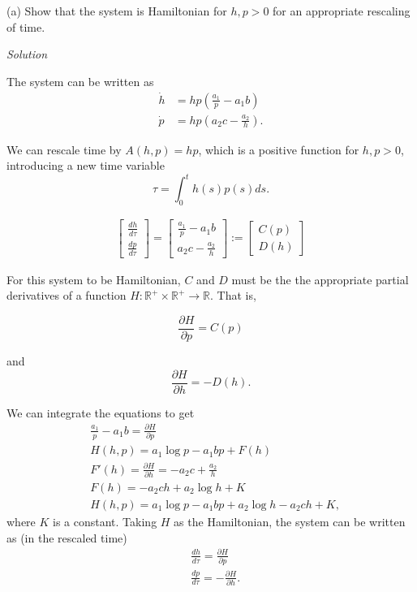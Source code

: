 \documentclass[a4paper,11pt,pdftex]{article}
\newcommand{\R}{\mathbb{R}}
\begin{document}
(a) Show that the system is Hamiltonian for $h,p>0$ for an appropriate rescaling of time. 

\emph{Solution}

The system can be written as
\begin{align*}
    \dot{h} &= hp\left(\frac{a_1}{p}-a_1b\right) \\ 
    \dot{p} &= hp\left(a_2c-\frac{a_2}{h}\right).
\end{align*}

We can rescale time by $A(h,p)=hp$, which is a positive function for $h,p>0$, introducing a new time variable 
$$
\tau = \int_0^t h(s)p(s)ds.
$$

\begin{align*}
    \begin{bmatrix}\frac{d h}{d\tau} \\
    \frac{d p}{d\tau}
    \end{bmatrix} = \begin{bmatrix} \frac{a_1}{p}-a_1b\\
    a_2c-\frac{a_2}{h}\end{bmatrix} := \begin{bmatrix}C(p) \\ D(h) \end{bmatrix}
\end{align*}

For this system to be Hamiltonian, $C$ and $D$ must be the the appropriate partial derivatives of a function $H:\R^+ \times \R^+ \to \R$. That is,

$$
\frac{\partial H}{\partial p} = C(p)
$$

and
$$
\frac{\partial H}{\partial h} = -D(h).
$$

We can integrate the equations to get
\begin{align*}
&\frac{a_1}{p}-a_1b = \frac{\partial H}{\partial p}\\
& H(h,p) = a_1\log p - a_1bp + F(h) \\
&  F'(h) = \frac{\partial H}{\partial h} = -a_2c + \frac{a_2}{h}\\
& F(h) = -a_2ch +a_2\log h + K \\
& H(h,p) = a_1\log p -a_1bp + a_2\log h -a_2ch +K,
\end{align*}
where $K$ is a constant. Taking $H$ as the Hamiltonian, the system can be written as (in the rescaled time)
\begin{align*}
    &\frac{d h}{ d\tau} = \frac{\partial H}{\partial p} \\
    &\frac{d p}{d\tau} = -\frac{\partial H}{\partial h}. 
\end{align*}
\end{document}
